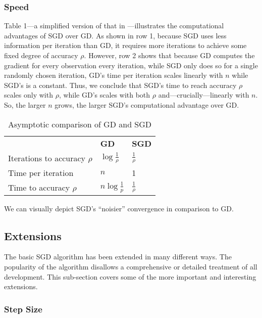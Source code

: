 \documentclass{article}
\begin{document}
\subsubsection{Speed}

Table 1---a simplified version of that in \cite{bottou2010large}---illustrates
the computational advantages of SGD over GD. As shown in row 1, because SGD uses
less information per iteration than GD, it requires more iterations to achieve
some fixed degree of accuracy $\rho$.
However, row 2 shows that because GD computes the gradient for every observation every iteration,
while SGD only does so for a single randomly chosen iteration, GD's time per
iteration scales linearly with $n$ while SGD's is a constant. Thus, we conclude
that SGD's time to
reach accuracy $\rho$ scales only with $\rho$, while GD's scales with both
$\rho$ and---crucially---linearly with $n$. So, the larger $n$ grows, the larger
SGD's computational advantage over GD.

\begin{table}[h!]
	\centering
	\caption{Asymptotic comparison of GD and SGD}
	\begin{tabular}{|l l l|}
		\hline
		& \textbf{GD} & \textbf{SGD} \\
		Iterations to accuracy $\rho$ & $\log \frac{1}{\rho}$ & $\frac{1}{\rho}$ \\
		Time per iteration & $n$ & 1 \\
		Time to accuracy $\rho$ & $n \log \frac{1}{p}$ & $\frac{1}{\rho}$ \\
		\hline
	\end{tabular}
\end{table}

We can visually depict SGD's ``noisier'' convergence in comparison to GD. 

\subsection{Extensions}

The basic SGD algorithm has been extended in many different ways. The popularity of
the algorithm disallows a comprehensive or detailed treatment of all
development. This sub-section covers some of the more important and interesting extensions.

\subsubsection{Step Size}
\end{document}
